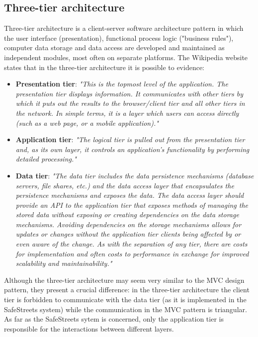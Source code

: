 \subsection{Three-tier architecture}
Three-tier architecture is a client-server software architecture pattern in which the user interface (presentation), functional process logic ("business rules"), computer data storage and data access are developed and maintained as independent modules, most often on separate platforms. The Wikipedia website states that in the three-tier architecture it is possible to evidence:
\begin{itemize}
    \item \textbf{Presentation tier}: 
    \textit{"This is the topmost level of the application. The presentation tier displays information. It communicates with other tiers by which it puts out the results to the browser/client tier and all other tiers in the network. In simple terms, it is a layer which users can access directly (such as a web page, or a mobile application)."}
    \item \textbf{Application tier}: \textit{
    "The logical tier is pulled out from the presentation tier and, as its own layer, it controls an application’s functionality by performing detailed processing."}
    \item \textbf{Data tier}: \textit{
        "The data tier includes the data persistence mechanisms (database servers, file shares, etc.) and the data access layer that encapsulates the persistence mechanisms and exposes the data. The data access layer should provide an API to the application tier that exposes methods of managing the stored data without exposing or creating dependencies on the data storage mechanisms. Avoiding dependencies on the storage mechanisms allows for updates or changes without the application tier clients being affected by or even aware of the change. As with the separation of any tier, there are costs for implementation and often costs to performance in exchange for improved scalability and maintainability."}
\end{itemize}
Although the three-tier architecture may seem very similar to the MVC design pattern, they present a crucial difference: in the three-tier architecture the client tier is forbidden to communicate with the data tier (as it is implemented in the SafeStreets system) while the communication in the MVC pattern is triangular. As far as the SafeStreets sytem is concerned, only the application tier is responsible for the interactions between different layers.
